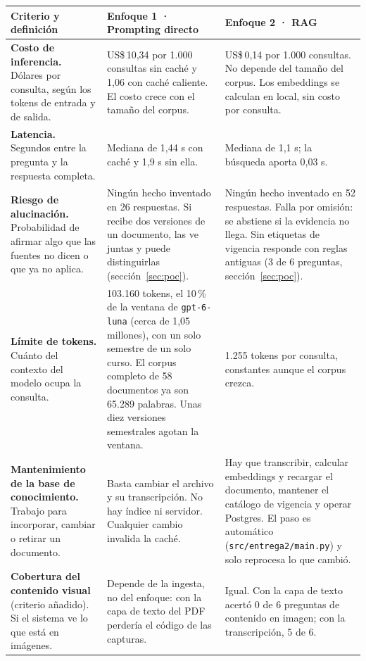 \documentclass[11pt,letterpaper]{article}
\newcommand{\cod}[1]{\texttt{\small #1}}
\begin{document}
\begin{table}[H]\footnotesize\renewcommand{\arraystretch}{1.2}
\begin{tabularx}{\textwidth}{>{\raggedright\arraybackslash}p{}LL}
\toprule
\textbf{Criterio y definición} & \textbf{Enfoque 1 · Prompting directo} & \textbf{Enfoque 2 · RAG} \\
\midrule
\textbf{Costo de inferencia.} Dólares por consulta, según los tokens de entrada y de salida. & US\$\,10,34 por 1.000 consultas sin caché y 1,06 con caché caliente. El costo crece con el tamaño del corpus. & US\$\,0,14 por 1.000 consultas. No depende del tamaño del corpus. Los embeddings se calculan en local, sin costo por consulta. \\
\textbf{Latencia.} Segundos entre la pregunta y la respuesta completa. & Mediana de 1,44 s con caché y 1,9 s sin ella. & Mediana de 1,1 s; la búsqueda aporta 0,03 s. \\
\textbf{Riesgo de alucinación.} Probabilidad de afirmar algo que las fuentes no dicen o que ya no aplica. & Ningún hecho inventado en 26 respuestas. Si recibe dos versiones de un documento, las ve juntas y puede distinguirlas (sección~\ref{sec:poc}). & Ningún hecho inventado en 52 respuestas. Falla por omisión: se abstiene si la evidencia no llega. Sin etiquetas de vigencia responde con reglas antiguas (3 de 6 preguntas, sección~\ref{sec:poc}). \\
\textbf{Límite de tokens.} Cuánto del contexto del modelo ocupa la consulta. & 103.160 tokens, el 10\,\% de la ventana de \cod{gpt-6-luna} (cerca de 1,05 millones), con un solo semestre de un solo curso. El corpus completo de 58 documentos ya son 65.289 palabras. Unas diez versiones semestrales agotan la ventana. & 1.255 tokens por consulta, constantes aunque el corpus crezca. \\
\textbf{Mantenimiento de la base de conocimiento.} Trabajo para incorporar, cambiar o retirar un documento. & Basta cambiar el archivo y su transcripción. No hay índice ni servidor. Cualquier cambio invalida la caché. & Hay que transcribir, calcular embeddings y recargar el documento, mantener el catálogo de vigencia y operar Postgres. El paso es automático (\cod{src/entrega2/main.py}) y solo reprocesa lo que cambió. \\
\textbf{Cobertura del contenido visual} (criterio añadido). Si el sistema ve lo que está en imágenes. & Depende de la ingesta, no del enfoque: con la capa de texto del PDF perdería el código de las capturas. & Igual. Con la capa de texto acertó 0 de 6 preguntas de contenido en imagen; con la transcripción, 5 de 6. \\

\end{tabularx}
\end{table}
\end{document}
